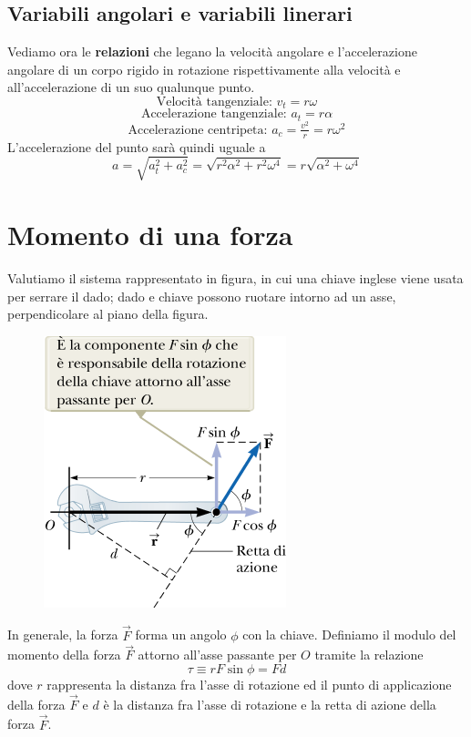 \documentclass[a4paper,11pt,oneside]{book}
\begin{document}
\subsection{Variabili angolari e variabili linerari}
Vediamo ora le \textbf{relazioni} che legano la velocità angolare e l'accelerazione angolare di un corpo rigido in rotazione rispettivamente
alla velocità e all'accelerazione di un suo qualunque punto.
\begin{equation*}
    \text{Velocità tangenziale: } v_t = r\omega
\end{equation*}
\begin{equation*}
    \text{Accelerazione tangenziale: } a_t = r\alpha
\end{equation*}
\begin{equation*}
    \text{Accelerazione centripeta: } a_c = \tfrac{v^2}{r} = r\omega^2
\end{equation*}
L'accelerazione del punto sarà quindi uguale a
\begin{equation*}
    a = \sqrt{a_t^2 + a_c^2} = \sqrt{r^2\alpha^2 + r^2\omega^4} = r\sqrt{\alpha^2 + \omega^4}
\end{equation*}

\section{Momento di una forza}
Valutiamo il sistema rappresentato in figura, in cui una chiave inglese viene usata per serrare il dado; dado e chiave possono ruotare intorno ad un asse, 
perpendicolare al piano della figura.
\begin{figure}[h]
    \includegraphics[scale=0.4]{momento_forza.png}
    \centering
\end{figure}

In generale, la forza $\vec{F}$ forma un angolo $\phi$ con la chiave. Definiamo il modulo del momento della forza $\vec{F}$ attorno all’asse passante per $O$ tramite la relazione
\begin{equation*}
    \tau \equiv r F \sin{\phi} = F d
\end{equation*}
dove $r$ rappresenta la distanza fra l’asse di rotazione ed il punto di applicazione della forza $\vec{F}$ e $d$ è la distanza fra l’asse di rotazione e la retta di azione della forza $\vec{F}$.
\end{document}
